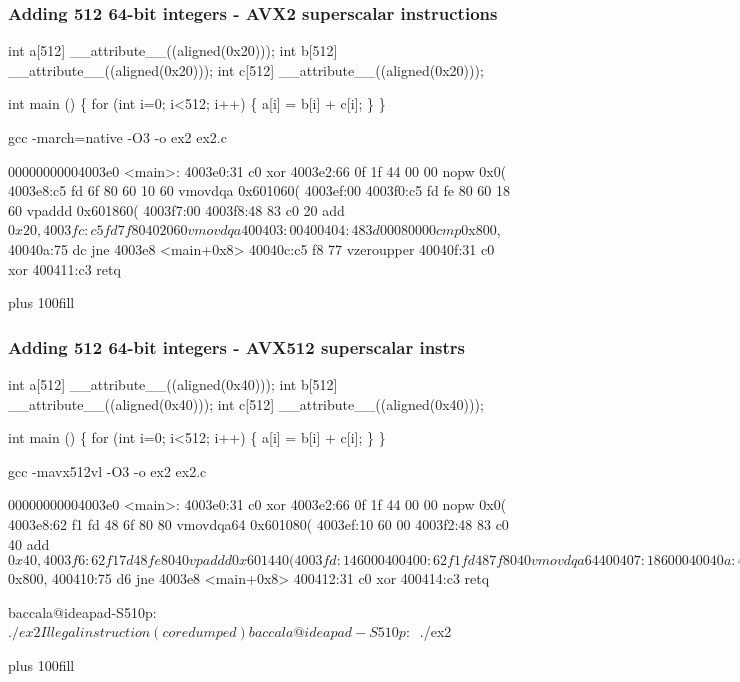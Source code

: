 \documentclass{beamer}
\begin{document}
\begin{frame}[fragile]
\frametitle{Adding 512 64-bit integers - AVX2 superscalar instructions}
\begin{semiverbatim}
\tiny
int a[512] __attribute__((aligned(0x20)));
int b[512] __attribute__((aligned(0x20)));
int c[512] __attribute__((aligned(0x20)));

int main () \{
  for (int i=0; i<512; i++) \{
    a[i] = b[i] + c[i];
  \}
\}

gcc -march=native -O3 -o ex2 ex2.c

00000000004003e0 <main>:
4003e0:31 c0                xor    %
4003e2:66 0f 1f 44 00 00    nopw   0x0(%
4003e8:c5 fd 6f 80 60 10 60 vmovdqa 0x601060(%
4003ef:00 
4003f0:c5 fd fe 80 60 18 60 vpaddd 0x601860(%
4003f7:00 
4003f8:48 83 c0 20          add    $0x20,%
4003fc:c5 fd 7f 80 40 20 60 vmovdqa %
400403:00 
400404:48 3d 00 08 00 00    cmp    $0x800,%
40040a:75 dc                jne    4003e8 <main+0x8>
40040c:c5 f8 77             vzeroupper 
40040f:31 c0                xor    %
400411:c3                   retq   

\end{semiverbatim}
\vskip 0pt plus 100fill
\end{frame}

\begin{frame}[fragile]
\frametitle{Adding 512 64-bit integers - AVX512 superscalar instrs}
\begin{semiverbatim}
\tiny
int a[512] __attribute__((aligned(0x40)));
int b[512] __attribute__((aligned(0x40)));
int c[512] __attribute__((aligned(0x40)));

int main () \{
  for (int i=0; i<512; i++) \{
    a[i] = b[i] + c[i];
  \}
\}

gcc -mavx512vl -O3 -o ex2 ex2.c

00000000004003e0 <main>:
4003e0:31 c0                xor    %
4003e2:66 0f 1f 44 00 00    nopw   0x0(%
4003e8:62 f1 fd 48 6f 80 80 vmovdqa64 0x601080(%
4003ef:10 60 00 
4003f2:48 83 c0 40          add    $0x40,%
4003f6:62 f1 7d 48 fe 80 40 vpaddd 0x601440(%
4003fd:14 60 00 
400400:62 f1 fd 48 7f 80 40 vmovdqa64 %
400407:18 60 00 
40040a:48 3d 00 08 00 00    cmp    $0x800,%
400410:75 d6                jne    4003e8 <main+0x8>
400412:31 c0                xor    %
400414:c3                   retq   

baccala@ideapad-S510p:~$ ./ex2
Illegal instruction (core dumped)
baccala@ideapad-S510p:~$ ./ex2

\end{semiverbatim}
\vskip 0pt plus 100fill
\end{frame}
\end{document}
